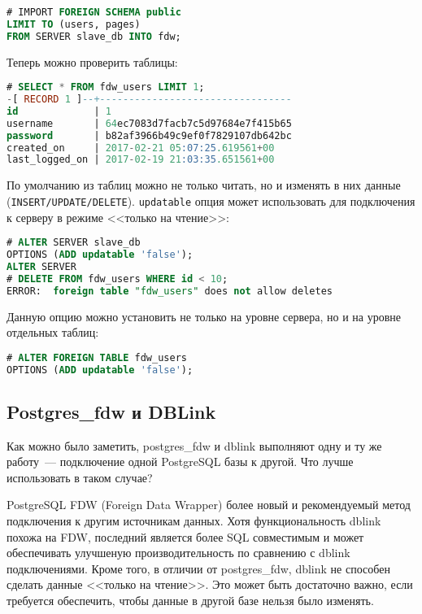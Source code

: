 \begin{lstlisting}[language=SQL,label=lst:postgresfdw5,caption=Импортируем таблицы]
# IMPORT FOREIGN SCHEMA public
LIMIT TO (users, pages)
FROM SERVER slave_db INTO fdw;
\end{lstlisting}

Теперь можно проверить таблицы:

\begin{lstlisting}[language=SQL,label=lst:postgresfdw6,caption=SELECT]
# SELECT * FROM fdw_users LIMIT 1;
-[ RECORD 1 ]--+---------------------------------
id             | 1
username       | 64ec7083d7facb7c5d97684e7f415b65
password       | b82af3966b49c9ef0f7829107db642bc
created_on     | 2017-02-21 05:07:25.619561+00
last_logged_on | 2017-02-19 21:03:35.651561+00
\end{lstlisting}

По умолчанию из таблиц можно не только читать, но и изменять в них данные (\lstinline!INSERT/UPDATE/DELETE!). \lstinline!updatable! опция может использовать для подключения к серверу в режиме <<только на чтение>>:

\begin{lstlisting}[language=SQL,label=lst:postgresfdw7,caption=Read-only mode]
# ALTER SERVER slave_db
OPTIONS (ADD updatable 'false');
ALTER SERVER
# DELETE FROM fdw_users WHERE id < 10;
ERROR:  foreign table "fdw_users" does not allow deletes
\end{lstlisting}

Данную опцию можно установить не только на уровне сервера, но и на уровне отдельных таблиц:

\begin{lstlisting}[language=SQL,label=lst:postgresfdw8,caption=Read-only mode для таблицы]
# ALTER FOREIGN TABLE fdw_users
OPTIONS (ADD updatable 'false');
\end{lstlisting}


\subsection{Postgres\_fdw и DBLink}

Как можно было заметить, postgres\_fdw и dblink выполняют одну и ту же работу~--- подключение одной PostgreSQL базы к другой. Что лучше использовать в таком случае?

PostgreSQL FDW (Foreign Data Wrapper) более новый и рекомендуемый метод подключения к другим источникам данных. Хотя функциональность dblink похожа на FDW, последний является более SQL совместимым и может обеспечивать улучшеную производительность по сравнению с dblink подключениями. Кроме того, в отличии от postgres\_fdw, dblink не способен сделать данные <<только на чтение>>. Это может быть достаточно важно, если требуется обеспечить, чтобы данные в другой базе нельзя было изменять.

